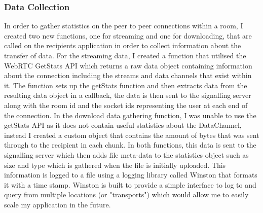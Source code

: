 \documentclass[]{report}
\begin{document}
				\subsubsection{Data Collection}
				In order to gather statistics on the peer to peer connections within a room, I created two new functions, one for streaming and one for downloading, that are called on the recipients application in order to collect information about the transfer of data. For the streaming data, I created a function that utilised the WebRTC GetStats API which returns a raw data object containing information about the connection including the streams and data channels that exist within it. The function sets up the getStats function and then extracts data from the resulting data object in a callback, the data is then sent  to the signalling server along with the room id and the socket ids representing the user at each end of the connection. In the download data gathering function, I was unable to use the getStats API as it does not contain useful statistics about the DataChannel, instead I created a custom object that contains the amount of bytes that was sent through to the recipient in each chunk. In both functions, this data is sent to the signalling server which then adds file meta-data to the statistics object such as size and type which is gathered when the file is initially uploaded. This information is logged to a file using a logging library called Winston that formats it with a time stamp. Winston is built to provide a simple interface to log to and query from multiple locations (or "transports") which would allow me to easily scale my application in the future.
				
\end{document}
